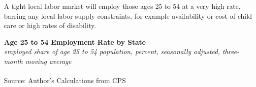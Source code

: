 \documentclass{report}
\begin{document}
{\begin{minipage}{0.76\textwidth}
\small A tight local labor market will employ those ages 25 to 54 at a very high rate, barring any local labor supply constraints, for example availability or cost of child care or high rates of disability. 


\end{minipage}

\normalsize \textbf{Age 25 to 54 Employment Rate by State}\\
\footnotesize{\textit{employed share of age 25 to 54 population, percent, seasonally adjusted, three-month moving average}}\\
\vspace{-3mm}
\hspace{-9mm}  \\
\footnotesize{Source: Author's Calculations from CPS}
\vspace{3mm}

}
\end{document}

